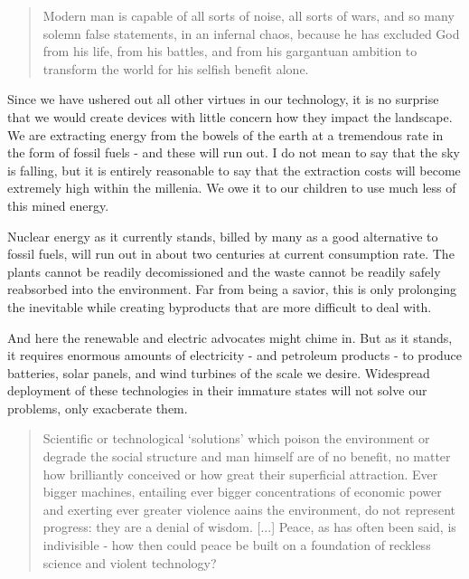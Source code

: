 \documentclass[letterpaper]{article}
\begin{document}
\begin{quote}
  Modern man is capable of all sorts of noise, all sorts of wars, and so many solemn false statements, in an infernal chaos, because he has excluded God from his life, from his battles, and from his gargantuan ambition to transform the world for his selfish benefit alone.
\end{quote}

Since we have ushered out all other virtues in our technology, it is no surprise that we would create devices with little concern how they impact the landscape. We are extracting energy from the bowels of the earth at a tremendous rate in the form of fossil fuels - and these will run out. I do not mean to say that the sky is falling, but it is entirely reasonable to say that the extraction costs will become extremely high within the millenia. We owe it to our children to use much less of this mined energy.

Nuclear energy as it currently stands, billed by many as a good alternative to fossil fuels, will run out in about two centuries at current consumption rate. The plants cannot be readily decomissioned and the waste cannot be readily safely reabsorbed into the environment. Far from being a savior, this is only prolonging the inevitable while creating byproducts that are more difficult to deal with.

And here the renewable and electric advocates might chime in. But as it stands, it requires enormous amounts of electricity - and petroleum products - to produce batteries, solar panels, and wind turbines of the scale we desire. Widespread deployment of these technologies in their immature states will not solve our problems, only exacberate them.

\begin{quote}
  Scientific or technological `solutions' which poison the environment or degrade the social structure and man himself are of no benefit, no matter how brilliantly conceived or how great their superficial attraction. Ever bigger machines, entailing ever bigger concentrations of economic power and exerting ever greater violence aains the environment, do not represent progress: they are a denial of wisdom. [...] Peace, as has often been said, is indivisible - how then could peace be built on a foundation of reckless science and violent technology?
\end{quote}
\end{document}
